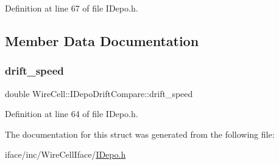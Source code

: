 Definition at line 67 of file I\+Depo.\+h.



\subsection{Member Data Documentation}
\mbox{\label{struct_wire_cell_1_1_i_depo_drift_compare_ae655f841d0c24e759f1a5683ce656049}} 
\subsubsection{\texorpdfstring{drift\+\_\+speed}{drift\_speed}}
{\footnotesize\ttfamily double Wire\+Cell\+::\+I\+Depo\+Drift\+Compare\+::drift\+\_\+speed}



Definition at line 64 of file I\+Depo.\+h.



The documentation for this struct was generated from the following file\+:\begin{DoxyCompactItemize}
\item 
iface/inc/\+Wire\+Cell\+Iface/\hyperlink{_i_depo_8h}{I\+Depo.\+h}\end{DoxyCompactItemize}

